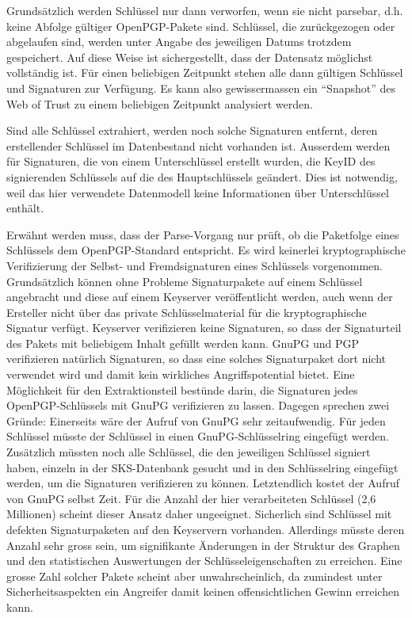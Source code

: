 Grundsätzlich werden Schlüssel nur dann verworfen, wenn sie nicht
parsebar, d.h. keine Abfolge gültiger OpenPGP-Pakete sind. Schlüssel,
die zurückgezogen oder abgelaufen sind, werden unter Angabe des
jeweiligen Datums trotzdem gespeichert. Auf diese Weise ist
sichergestellt, dass der Datensatz möglichst vollständig ist. Für
einen beliebigen Zeitpunkt stehen alle dann gültigen Schlüssel und
Signaturen zur Verfügung. Es kann also gewissermassen ein
"`Snapshot"' des Web of Trust zu einem beliebigen Zeitpunkt
analysiert werden.

Sind alle Schlüssel extrahiert, werden noch solche Signaturen
entfernt, deren erstellender Schlüssel im Datenbestand nicht vorhanden
ist. Ausserdem werden für Signaturen, die von einem Unterschlüssel
erstellt wurden, die KeyID des signierenden Schlüssels auf die des
Hauptschl\"ussels geändert. Dies ist notwendig, weil das hier
verwendete Datenmodell keine Informationen über Unterschlüssel
enthält.

Erwähnt werden muss, dass der Parse-Vorgang nur prüft, ob die
Paketfolge eines Schlüssels dem OpenPGP-Standard entspricht. Es wird
keinerlei kryptographische Verifizierung der Selbst- und
Fremdsignaturen eines Schlüssels vorgenommen. Grundsätzlich können
ohne Probleme Signaturpakete auf einem Schlüssel angebracht und diese
auf einem Keyserver veröffentlicht werden, auch wenn der Ersteller
nicht über das private Schlüsselmaterial für die kryptographische
Signatur verfügt. Keyserver verifizieren keine Signaturen, so dass der
Signaturteil des Pakets mit beliebigem Inhalt gefüllt werden
kann. GnuPG und PGP verifizieren natürlich Signaturen, so dass eine
solches Signaturpaket dort nicht verwendet wird und damit kein
wirkliches Angriffspotential bietet. Eine Möglichkeit für den
Extraktionsteil bestünde darin, die Signaturen jedes
OpenPGP-Schlüssels mit GnuPG verifizieren zu lassen. Dagegen sprechen
zwei Gründe: Einerseits wäre der Aufruf von GnuPG sehr
zeitaufwendig. Für jeden Schlüssel müsste der Schlüssel in einen
GnuPG-Schlüsselring eingefügt werden. Zusätzlich müssten noch alle
Schlüssel, die den jeweiligen Schlüssel signiert haben, einzeln in der
SKS-Datenbank gesucht und in den Schlüsselring eingefügt werden, um
die Signaturen verifizieren zu können. Letztendlich kostet der Aufruf
von GnuPG selbst Zeit. Für die Anzahl der hier verarbeiteten Schlüssel
(2,6 Millionen) scheint dieser Ansatz daher ungeeignet. Sicherlich
sind Schlüssel mit defekten Signaturpaketen auf den Keyservern
vorhanden. Allerdings müsste deren Anzahl sehr gross sein, um
signifikante Änderungen in der Struktur des Graphen und den
statistischen Auswertungen der Schlüsseleigenschaften zu
erreichen. Eine grosse Zahl solcher Pakete scheint aber
unwahrscheinlich, da zumindest unter Sicherheitsaspekten ein Angreifer
damit keinen offensichtlichen Gewinn erreichen kann.

